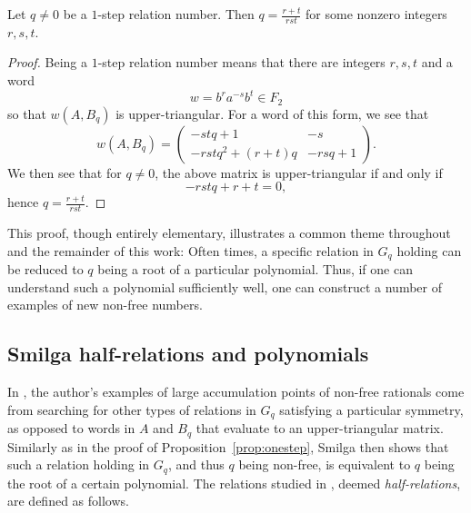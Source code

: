 \documentclass[11 pt]{amsart}
\begin{document}
\begin{proposition}
\label{prop:onestep}
    Let $q\neq 0$ be a $1$-step relation number. Then $q=\frac{r+t}{rst}$ for some nonzero integers $r,s,t$.
\end{proposition}
\begin{proof}
    Being a $1$-step relation number means that there are integers $r,s,t$ and a word 
    \[
    w=b^r a^{-s} b^t\in F_2
    \]
    so that $w(A,B_q)$ is upper-triangular. For a word of this form, we see that
    \[
    w(A,B_q)=\begin{pmatrix}
        -s t q + 1 & -s \\
-r s tq^2 + (r+t) q & -rsq + 1
    \end{pmatrix}.
    \]
    We then see that for $q\neq 0$, the above matrix is upper-triangular if and only if
    \[
    -rstq+r+t=0,
    \]
    hence $q=\frac{r+t}{rst}$.
\end{proof}

This proof, though entirely elementary, illustrates a common theme throughout \cite{Smilga2021} and the remainder of this work: Often times, a specific relation in $G_q$ holding can be reduced to $q$ being a root of a particular polynomial. Thus, if one can understand such a polynomial sufficiently well, one can construct a number of examples of new non-free numbers.

\subsection{Smilga half-relations and polynomials}
In \cite{Smilga2021}, the author's examples of large accumulation points of non-free rationals come from searching for other types of relations in $G_q$ satisfying a particular symmetry, as opposed to words in $A$ and $B_q$ that evaluate to an upper-triangular matrix. Similarly as in the proof of Proposition~\ref{prop:onestep}, Smilga then shows that such a relation holding in $G_q$, and thus $q$ being non-free, is equivalent to $q$ being the root of a certain polynomial. The relations studied in \cite{Smilga2021}, deemed \textit{half-relations}, are defined as follows.
\end{document}
